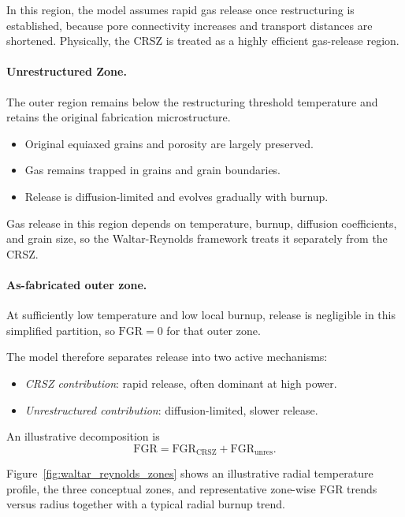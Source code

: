\begin{refsection}
In this region, the model assumes rapid gas release once restructuring is established, because pore connectivity increases and transport distances are shortened. Physically, the CRSZ is treated as a highly efficient gas-release region.

\paragraph{Unrestructured Zone.} The outer region remains below the restructuring threshold temperature and retains the original fabrication microstructure.

\begin{itemize}
\item Original equiaxed grains and porosity are largely preserved.
\item Gas remains trapped in grains and grain boundaries.
\item Release is diffusion-limited and evolves gradually with burnup.
\end{itemize}

Gas release in this region depends on temperature, burnup, diffusion coefficients, and grain size, so the Waltar-Reynolds framework treats it separately from the CRSZ.

\paragraph{As-fabricated outer zone.} At sufficiently low temperature and low local burnup, release is negligible in this simplified partition, so $\mathrm{FGR}=0$ for that outer zone.

The model therefore separates release into two active mechanisms:
\begin{itemize}
\item \emph{CRSZ contribution}: rapid release, often dominant at high power.
\item \emph{Unrestructured contribution}: diffusion-limited, slower release.
\end{itemize}

An illustrative decomposition is
\begin{equation}
  \mathrm{FGR} = \mathrm{FGR}_{\mathrm{CRSZ}} + \mathrm{FGR}_{\mathrm{unres}}.
  \label{eq:fgr_split}
\end{equation}

Figure~\ref{fig:waltar_reynolds_zones} shows an illustrative radial temperature profile, the three conceptual zones, and representative zone-wise FGR trends versus radius together with a typical radial burnup trend.


\end{refsection}
